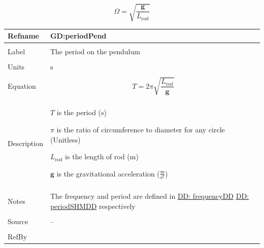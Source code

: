 \documentclass[12pt]{article}
\begin{document}
\begin{displaymath}
Ω=\sqrt{\frac{\mathbf{g}}{{L_{\text{rod}}}}}
\end{displaymath}
\vspace{\baselineskip}
\noindent
\begin{minipage}{\textwidth}
\begin{tabular}{>{\raggedright}p{}>{\raggedright\arraybackslash}p{}}
\toprule \textbf{Refname} & \textbf{GD:periodPend}
\label{GD:periodPend}
\\ \midrule \\
Label & The period on the pendulum
        
\\ \midrule \\
Units & ${\text{s}}$
        
\\ \midrule \\
Equation & \begin{displaymath}
           T=2 π \sqrt{\frac{{L_{\text{rod}}}}{\mathbf{g}}}
           \end{displaymath}
\\ \midrule \\
Description & \begin{symbDescription}
              \item{$T$ is the period (${\text{s}}$)}
              \item{$π$ is the ratio of circumference to diameter for any circle (Unitless)}
              \item{${L_{\text{rod}}}$ is the length of rod (${\text{m}}$)}
              \item{$\mathbf{g}$ is the gravitational acceleration ($\frac{\text{m}}{\text{s}^{2}}$)}
              \end{symbDescription}
\\ \midrule \\
Notes & The frequency and period are defined in \hyperref[DD:frequencyDD]{DD: frequencyDD} \hyperref[DD:periodSHMDD]{DD: periodSHMDD} respectively
        
\\ \midrule \\
Source & --
         
\\ \midrule \\
RefBy & 
\\ \bottomrule
\end{tabular}
\end{minipage}
\end{document}
